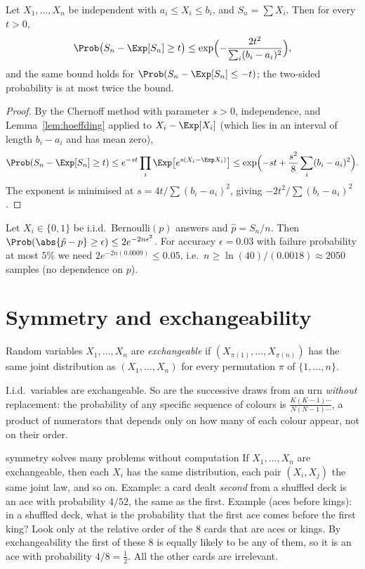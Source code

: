 \begin{theorem}\label{thm:hoeffding}
Let $X_1,\dots,X_n$ be independent with $a_i\le X_i\le b_i$, and
$S_n=\sum X_i$. Then for every $t>0$,
\[
\Prob\bigl(S_n-\Exp[S_n]\ge t\bigr)\le\exp\Bigl(-\frac{2t^2}{\sum_i(b_i-a_i)^2}\Bigr),
\]
and the same bound holds for $\Prob(S_n-\Exp[S_n]\le-t)$; the two-sided probability
is at most twice the bound.
\end{theorem}
\begin{proof}
By the Chernoff method with parameter $s>0$, independence, and
Lemma~\ref{lem:hoeffding} applied to $X_i-\Exp[X_i]$ (which lies in an interval of
length $b_i-a_i$ and has mean zero),
\[
\Prob(S_n-\Exp[S_n]\ge t)\le e^{-st}\prod_i\Exp\bigl[e^{s(X_i-\Exp X_i)}\bigr]
\le\exp\Bigl(-st+\frac{s^2}8\sum_i(b_i-a_i)^2\Bigr).
\]
The exponent is minimised at $s=4t/\sum(b_i-a_i)^2$, giving
$-2t^2/\sum(b_i-a_i)^2$.
\end{proof}

\begin{example}[Polling]
Let $X_i\in\{0,1\}$ be i.i.d.\ Bernoulli$(p)$ answers and $\hat p=S_n/n$. Then
$\Prob(\abs{\hat p-p}\ge\epsilon)\le2e^{-2n\epsilon^2}$. For accuracy
$\epsilon=0.03$ with failure probability at most $5\%$ we need
$2e^{-2n(0.0009)}\le0.05$, i.e.\ $n\ge\ln(40)/(0.0018)\approx2050$ samples
(no dependence on $p$).
\end{example}

\section{Symmetry and exchangeability}

\begin{definition}[Exchangeable]
Random variables $X_1,\dots,X_n$ are \emph{exchangeable} if
$(X_{\pi(1)},\dots,X_{\pi(n)})$ has the same joint distribution as $(X_1,\dots,X_n)$
for every permutation $\pi$ of $\{1,\dots,n\}$.
\end{definition}

I.i.d.\ variables are exchangeable. So are the successive draws from an urn
\emph{without} replacement: the probability of any specific sequence of colours is
$\frac{K(K-1)\cdots}{N(N-1)\cdots}$, a product of numerators that depends only on how many
of each colour appear, not on their order.

\begin{interview}{symmetry solves many problems without computation}
If $X_1,\dots,X_n$ are exchangeable, then each $X_i$ has the same distribution, each
pair $(X_i,X_j)$ the same joint law, and so on. Example: a card dealt \emph{second}
from a shuffled deck is an ace with probability $4/52$, the same as the first.
Example (aces before kings): in a shuffled deck, what is the probability that the
first ace comes before the first king? Look only at the relative order of the $8$
cards that are aces or kings. By exchangeability the first of these $8$ is equally
likely to be any of them, so it is an ace with probability $4/8=\tfrac12$. All the
other cards are irrelevant.
\end{interview}

